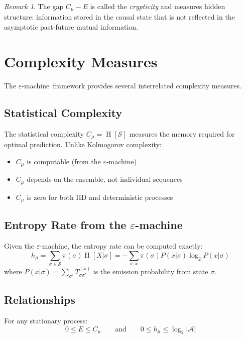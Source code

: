 \documentclass[11pt,twocolumn]{article}
\theoremstyle{plain}
\theoremstyle{definition}
\theoremstyle{remark}
\newtheorem{remark}[theorem]{Remark}
\newcommand{\eps}{\varepsilon}
\newcommand{\eM}{$\eps$-machine}
\newcommand{\Cmu}{C_\mu}
\newcommand{\hmu}{h_\mu}
\newcommand{\calS}{\mathcal{S}}
\newcommand{\calA}{\mathcal{A}}
\DeclareMathOperator{\Ent}{H}
\begin{document}
\begin{remark}
The gap $\Cmu - E$ is called the \emph{crypticity} and measures hidden structure: information stored in the causal state that is not reflected in the asymptotic past-future mutual information.
\end{remark}

\section{Complexity Measures}
\label{sec:measures}

The \eM\ framework provides several interrelated complexity measures.

\subsection{Statistical Complexity}

The statistical complexity $\Cmu = \Ent[\calS]$ measures the memory required for optimal prediction. Unlike Kolmogorov complexity:
\begin{itemize}[nosep]
    \item $\Cmu$ is computable (from the \eM)
    \item $\Cmu$ depends on the ensemble, not individual sequences
    \item $\Cmu$ is zero for both IID and deterministic processes
\end{itemize}

\subsection{Entropy Rate from the \eM}

Given the \eM, the entropy rate can be computed exactly:
\begin{equation}
    \hmu = \sum_{\sigma \in \calS} \pi(\sigma) \Ent[X | \sigma] = -\sum_{\sigma,x} \pi(\sigma) P(x|\sigma) \log_2 P(x|\sigma)
\end{equation}
where $P(x|\sigma) = \sum_{\sigma'} T^{(x)}_{\sigma\sigma'}$ is the emission probability from state $\sigma$.

\subsection{Relationships}

For any stationary process:
\begin{equation}
    0 \leq E \leq \Cmu \qquad \text{and} \qquad 0 \leq \hmu \leq \log_2 |\calA|
\end{equation}
\end{document}
